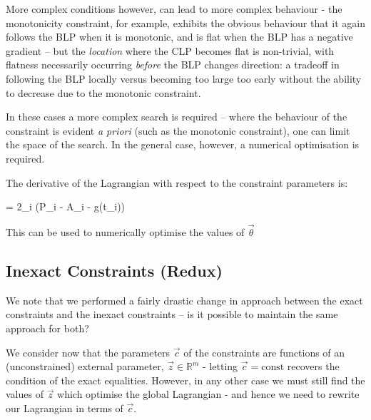\documentclass[]{article}
\begin{document}
			More complex conditions however, can lead to more complex behaviour - the monotonicity constraint, for example, exhibits the obvious behaviour that it again follows the BLP when it is monotonic, and is flat when the BLP has a negative gradient -- but the \textit{location} where the CLP becomes flat is non-trivial, with flatness necessarily occurring \textit{before} the BLP changes direction: a tradeoff in following the BLP locally versus becoming too large too early without the ability to decrease due to the monotonic constraint.

			In these cases a more complex search is required -- where the behaviour of the constraint is evident \textit{a priori} (such as the monotonic constraint), one can limit the space of the search. In the general case, however, a numerical optimisation is required. 

			The derivative of the Lagrangian with respect to the constraint parameters is:
			\begin{spalign}
				 = 2\sum_i \left(P_i - A_i - g(t_i)\right) 
			\end{spalign}
			This can be used to numerically optimise the values of $\vec{\theta}$

		\subsection{Inexact Constraints (Redux)}
			
			We note that we performed a fairly drastic change in approach between the exact constraints and the inexact constraints -- is it possible to maintain the same approach for both?

			We consider now that the parameters $\vec{c}$ of the constraints are functions of an (unconstrained) external parameter, $\vec{z} \in \mathbb{R}^m$ - letting $\vec{c} = \text{const}$ recovers the condition of the exact equalities. However, in any  other case we must still find the values of $\vec{z}$ which optimise the global Lagrangian - and hence we need to rewrite our Lagrangian in terms of $\vec{c}$.
\end{document}
